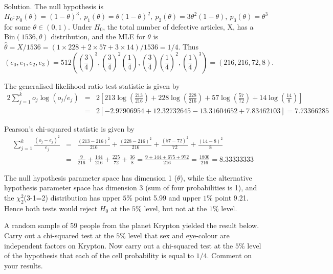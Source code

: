 Solution. The null hypothesis is
\begin{equation}
H_0: p_0(\theta)=(1-\theta)^3,\ p_1(\theta)=\theta(1-\theta)^2,\ p_2(\theta)=3\theta^2(1-\theta),\ p_3(\theta)=\theta^3
\end{equation}
for some $\theta\in(0,1)$. Under $H_0$, the total number of defective articles, X, has a $\text{Bin}(1536,\theta)$ distribution, and the MLE for $\theta$ is $\hat{\theta}=X/1536 = (1\times 228+ 2\times 57 + 3\times 14)/1536=1/4$. Thus
\begin{equation}
(e_0,e_1,e_2,e_3)= 512\left(\left(\frac 34\right)^3,\left(\frac 34\right)^2\left(\frac 14\right),\left(\frac 34\right)\left(\frac 14\right)^2,\left(\frac 14\right)^3 \right) = (216,216,72,8).
\end{equation}

The generalised likelihood ratio test statistic is given by
\begin{eqnarray}
2\sum^k_{j=1}o_j\log(o_j/e_j) & = & 2\left[213\log\left(\frac{213}{216}\right) + 228\log\left(\frac{228}{216}\right) + 57\log\left(\frac{57}{72}\right) + 14\log\left(\frac{14}{8}\right)\right] \nonumber\\
& = & 2\left[-2.97906954 + 12.32732645 - 13.31604652 + 7.83462103\right] = 7.73366285
\end{eqnarray}

Pearson's chi-squared statistic is given by
\begin{eqnarray}
\sum^k_{j=1}\frac{(o_j-e_j)^2}{e_j} & = & \frac{(213-216)^2}{216} + \frac{(228-216)^2}{216} + \frac{(57-72)^2}{72} + \frac{(14-8)^2}{8}\nonumber\\
& = & \frac{9}{216} + \frac{144}{216}+ \frac{225}{72} + \frac{36}{8} = \frac{9+144+675+972}{216} = \frac{1800}{216} = 8.33333333
\end{eqnarray}

The null hypothesis parameter space has dimension 1 ($\theta$), while the alternative hypothesis parameter space has dimension 3 (sum of four probabilities is 1), and the $\chi_2^2$(3-1=2) distribution has upper $5\%$ point 5.99 and upper $1\%$ point 9.21. Hence both tests would reject $H_0$ at the $5\%$ level, but not at the $1\%$ level.





\item A random sample of 59 people from the planet Krypton yielded the result below. Carry out a chi-squared test at the $5\%$ level that sex and eye-colour are independent factors on Krypton. Now carry out a chi-squared test at the $5\%$ level of the hypothesis that each of the cell probability is equal to $1/4$. Comment on your results.

